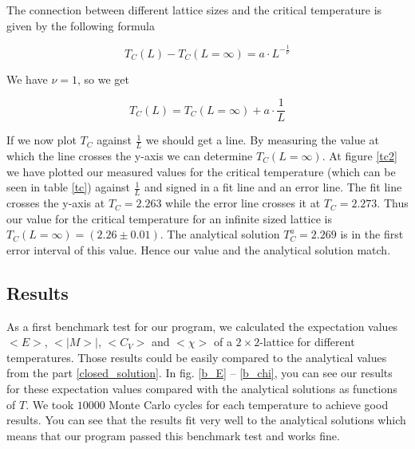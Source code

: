 \documentclass[10pt,a4paper]{article}
\begin{document}

The connection between different lattice sizes and the critical temperature is given by the following formula

\begin{equation}
T_C(L) - T_C(L = \infty) = a \cdot L^{-\frac{1}{\nu}}
\end{equation}

We have $\nu = 1$, so we get

\begin{equation}
T_C(L) = T_C(L = \infty) + a \cdot \frac{1}{L}
\end{equation}

If we now plot $T_C$ against $\frac{1}{L}$ we should get a line. By measuring the value at which the line crosses the y-axis we can determine $T_C(L = \infty)$. At figure \ref*{tc2} we have plotted our measured values for the critical temperature (which can be seen in table \ref*{tc}) against $\frac{1}{L}$ and signed in a fit line and an error line. The fit line crosses the y-axis at $T_C = 2.263$ while the error line crosses it at $T_C = 2.273$. Thus our value for the critical temperature for an infinite sized lattice is $T_C(L = \infty) = (2.26 \pm 0.01)$. The analytical solution $T_C^{a} = 2.269$ is in the first error interval of this value. Hence our value and the analytical solution match.



\subsection{Results}
As a first benchmark test for our program, we calculated the expectation values $<E>$, $<|M>|$, $<C_V>$ and $<\chi>$ of a $2\times2$-lattice for different temperatures. Those results could be easily compared to the analytical values from the part \ref{closed_solution}. In fig. \ref{b_E} -- \ref{b_chi}, you can see our results for these expectation values compared with the analytical solutions as functions of $T$. We took $10000$ Monte Carlo cycles for each temperature to achieve good results. You can see that the results fit very well to the analytical solutions which means that our program passed this benchmark test and works fine.
\end{document}
